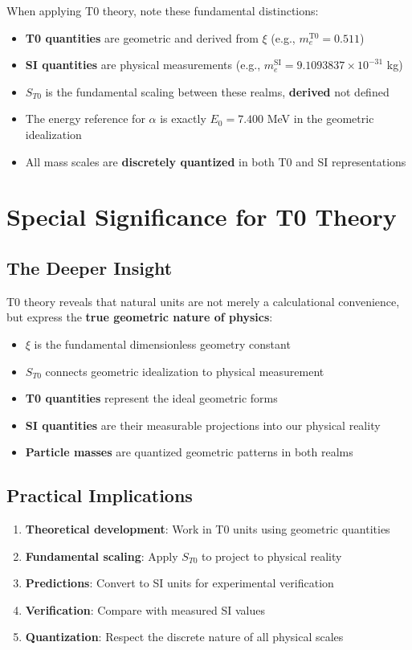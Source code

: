 	When applying T0 theory, note these fundamental distinctions:
	
	\begin{itemize}
		\item \textbf{T0 quantities} are geometric and derived from $\xi$ (e.g., $m_e^{\mathrm{T0}} = 0.511$)
		\item \textbf{SI quantities} are physical measurements (e.g., $m_e^{\mathrm{SI}} = 9.1093837\times 10^{-31}$ kg)
		\item \textbf{$S_{T0}$} is the fundamental scaling between these realms, \textbf{derived} not defined
		\item The energy reference for $\alpha$ is exactly $E_0 = 7.400$ MeV in the geometric idealization
		\item All mass scales are \textbf{discretely quantized} in both T0 and SI representations
	\end{itemize}
	
	\section{Special Significance for T0 Theory}
	
	\subsection{The Deeper Insight}
	T0 theory reveals that natural units are not merely a calculational convenience, but express the \textbf{true geometric nature of physics}:
	\begin{itemize}
		\item \textbf{$\xi$} is the fundamental dimensionless geometry constant
		\item \textbf{$S_{T0}$} connects geometric idealization to physical measurement
		\item \textbf{T0 quantities} represent the ideal geometric forms
		\item \textbf{SI quantities} are their measurable projections into our physical reality
		\item \textbf{Particle masses} are quantized geometric patterns in both realms
	\end{itemize}
	
	\subsection{Practical Implications}
	\begin{enumerate}
		\item \textbf{Theoretical development}: Work in T0 units using geometric quantities
		\item \textbf{Fundamental scaling}: Apply $S_{T0}$ to project to physical reality
		\item \textbf{Predictions}: Convert to SI units for experimental verification
		\item \textbf{Verification}: Compare with measured SI values
		\item \textbf{Quantization}: Respect the discrete nature of all physical scales
	\end{enumerate}
	
